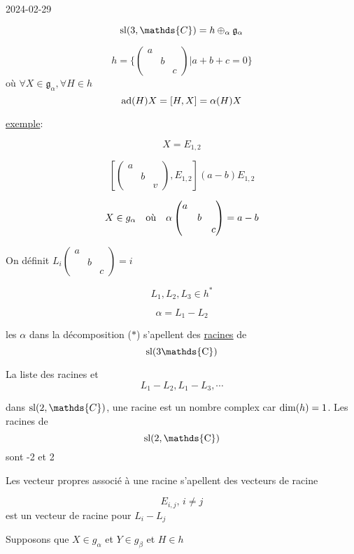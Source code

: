 


2024-02-29

\[ {\rm{}sl}(3, \mathds{C}) = h \oplus_{\alpha} \mathfrak{g}_\alpha \]

\[ h = \{ \begin{pmatrix} a \\ & b \\ &&c \end{pmatrix} | a+b+c =0 \}  \]
où \(\forall X \in \mathfrak{g}_\alpha, \forall H \in h \)
\[ {\rm{}ad} (H) X = [H, X] = \alpha (H) X  \]

\underline{exemple}:

\[ X =E_{1,2}  \]

\[ \left[ \begin{pmatrix} a \\ &b \\&&v \end{pmatrix}, E_{1,2}  \right] (a-b) E_{1,2} \]

\[ X \in g_{\alpha} \qq{où} \alpha\begin{pmatrix} a \\ & b\\ &&c \end{pmatrix} = a -b \]

On définit \(L_i \begin{pmatrix} a \\ &b \\&&c \end{pmatrix} = i\)

\[ L_1 , L_2 , L_3 \in h^{*} \]

\[ \alpha = L_1 - L_2 \]

les \(\alpha\) dans la décomposition (\(*\)) s'apellent des \underline{racines} de \[ {\rm{}sl(3 \mathds{C})} \] 

La liste des racines et 
\[ L_1-L_2 , L_1 - L_3 , \dotsb\]

\begin{tcolorbox}
	dans \({\rm{}sl}(2, \mathds{C})\), une racine est un nombre complex car \({\rm{}dim}(h)=1\). Les racines de \[ {\rm{}sl(2,\mathds{C})} \]  sont -2 et 2
\end{tcolorbox}

Les vecteur propres associé à une racine s'apellent des vecteurs de racine

\[ E_{i,j},\, i\neq j  \] est un vecteur de racine pour \(L_i -L_j \)

Supposons que \(X \in g_{\alpha} \) et \(Y \in g_{\beta} \) et \(H \in h\)

